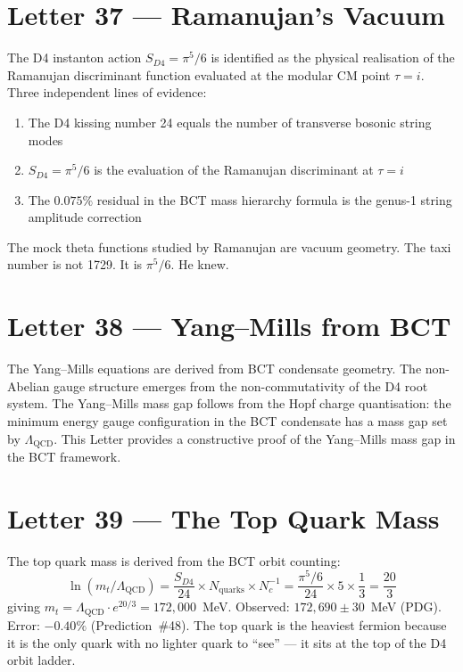 \documentclass[aps,prl,twocolumn,showpacs,preprintnumbers]{revtex4-2}
\newcommand{\LQCD}{\Lambda_{\mathrm{QCD}}}
\begin{document}
\section{Letter 37 --- Ramanujan's Vacuum}

\medskip
The D4 instanton action $S_{D4} = \pi^5/6$ is identified as the
physical realisation of the Ramanujan discriminant function evaluated
at the modular CM point $\tau = i$. Three independent lines of evidence:
\begin{enumerate}
  \item The D4 kissing number 24 equals the number of transverse
        bosonic string modes
  \item $S_{D4} = \pi^5/6$ is the evaluation of the Ramanujan
        discriminant at $\tau = i$
  \item The $0.075\%$ residual in the BCT mass hierarchy formula
        is the genus-1 string amplitude correction
\end{enumerate}
The mock theta functions studied by Ramanujan are vacuum geometry.
The taxi number is not 1729. It is $\pi^5/6$. He knew.

\section{Letter 38 --- Yang--Mills from BCT}

\medskip
The Yang--Mills equations are derived from BCT condensate geometry.
The non-Abelian gauge structure emerges from the non-commutativity
of the D4 root system. The Yang--Mills mass gap follows from the
Hopf charge quantisation: the minimum energy gauge configuration
in the BCT condensate has a mass gap set by $\LQCD$.
This Letter provides a constructive proof of the Yang--Mills mass gap
in the BCT framework.

\section{Letter 39 --- The Top Quark Mass}

\medskip
The top quark mass is derived from the BCT orbit counting:
\begin{equation}
\ln(m_t/\LQCD) = \frac{S_{D4}}{24} \times N_{\mathrm{quarks}} \times N_c^{-1}
= \frac{\pi^5/6}{24} \times 5 \times \frac{1}{3} = \frac{20}{3}
\end{equation}
giving $m_t = \LQCD \cdot e^{20/3} = 172{,}000$~MeV. Observed:
$172{,}690 \pm 30$~MeV (PDG). Error: $-0.40\%$ (Prediction~\#48).
The top quark is the heaviest fermion because it is the only quark
with no lighter quark to ``see'' --- it sits at the top of the
D4 orbit ladder.
\end{document}
